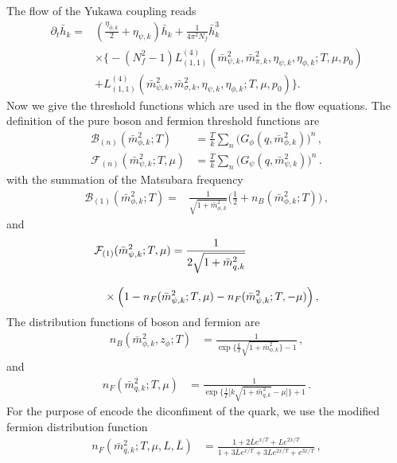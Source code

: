 \documentclass[%
reprint,
superscriptaddress,
showpacs,preprintnumbers,
 amsmath,amssymb,
 aps,
prd,
]{revtex4-1}
\begin{document}
The flow of the Yukawa coupling reads
\begin{align}
\partial_t\bar h_k=&(\frac{\eta_{\phi,k}}{2}+\eta_{\psi,k})\bar h_k+\frac{1}{4\pi^2 N_f}\bar h^3_k\nonumber\\[2ex]
&\times \bigg\{-(N_f^2-1)L^{(4)}_{(1,1)}(\bar m^2_{\psi,k},\bar m^2_{\pi,k},\eta_{\psi,k},\eta_{\phi,k};T,\mu,p_0)\nonumber\\[2ex]
&+L^{(4)}_{(1,1)}(\bar m^2_{\psi,k},\bar m^2_{\sigma,k},\eta_{\psi,k},\eta_{\phi,k};T,\mu,p_0)\bigg\}.\label{eq:yukawa}
\end{align}
Now we give the threshold functions which are used in the flow equations. The definition of the pure boson and fermion threshold functions are
\begin{align}
  \mathcal{B}_{(n)}(\bar{m}^{2}_{\phi,k};T)&=\frac{T}{k}\sum_{n}\Big(G_{\phi}(q,\bar{m}^{2}_{\phi,k})\Big)^n\,,\label{eq:Bn} \\[2ex]
  \mathcal{F}_{(n)}(\bar{m}^{2}_{\psi,k};T,\mu)&=\frac{T}{k}\sum_{n}\Big(G_\psi(q,\bar{m}^{2}_{\psi,k})\Big)^n\,.\label{eq:Fn}
\end{align}
with the summation of the Matsubara frequency
\begin{align}
    \mathcal{B}_{(1)}(\bar{m}^{2}_{\phi,k};T)=&\frac{1}{\sqrt{1+\bar{m}^{2}_{\phi,k}}}\bigg(\frac{1}{2}+n_{B}(\bar{m}^{2}_{\phi,k};T)\bigg)\,,\label{eq:B1}
\end{align}
and
\begin{align}
    &\mathcal{F}_{(1)}(\bar{m}^{2}_{\psi,k};T,\mu)=\frac{1}{2\sqrt{1+\bar{m}^{2}_{q,k}}}\nonumber\\[2ex]
    &\hspace{.3cm}\times\Big(1-n_{F}(\bar{m}^{2}_{\psi,k};T,\mu)-n_{F}(\bar{m}^{2}_{\psi,k};T,-\mu)\Big)\,,\label{eq:F1}
\end{align}
The distribution functions of boson and fermion are
\begin{align}
  n_B(\bar{m}^{2}_{\phi,k},z_\phi;T)&=\frac{1}{\exp\bigg\{\frac{k}{T}\sqrt{1+\bar{m}^{2}_{\phi,k}}\bigg\}-1}\,,
\end{align} 
and
\begin{align}
  n_F(\bar{m}^{2}_{q,k};T,\mu)&=\frac{1}{\exp\bigg\{\frac{1}{T}\Big[k\sqrt{1+\bar{m}^{2}_{q,k}}-\mu\Big]\bigg\}+1}\,.\label{eq:nf}
\end{align}
For the purpose of encode the diconfiment of the quark, we use the modified fermion distribution function 
\begin{align}
n_F(\bar{m}^{2}_{q,k};T,\mu,L,\bar{L})&=\frac{1+2\bar{L}e^{x/T}+Le^{2x/T}}{1+3\bar{L}e^{x/T}+3Le^{2x/T}+e^{3x/T}}\,,
\end{align}
\end{document}
